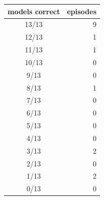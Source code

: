 \begin{tabular}{cr}
\toprule
models correct & episodes \\
\midrule
13/13 & 9 \\
12/13 & 1 \\
11/13 & 1 \\
10/13 & 0 \\
9/13 & 0 \\
8/13 & 1 \\
7/13 & 0 \\
6/13 & 0 \\
5/13 & 0 \\
4/13 & 0 \\
3/13 & 2 \\
2/13 & 0 \\
1/13 & 2 \\
0/13 & 0 \\
\bottomrule
\end{tabular}
